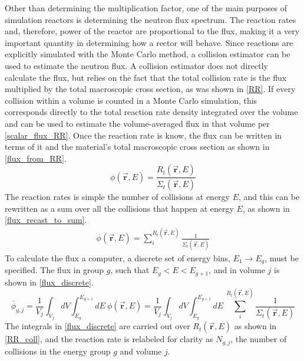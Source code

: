Other than determining the multiplication factor, one of the main purposes of simulation reactors is determining the neutron flux spectrum.  The reaction rates and, therefore, power of the reactor are proportional to the flux, making it a very important quantity in determining how a rector will behave.  Since reactions are explicitly simulated with the  Monte Carlo method, a collision estimator can be used to estimate the neutron flux.  A collision estimator does not directly calculate the flux, but relies on the fact that the total collision rate is the flux multiplied by the total macroscopic cross section, as was shown in \eqref{RR}.  If every collision within a volume is counted in a Monte Carlo simulation, this corresponds directly to the total reaction rate density integrated over the volume and can be used to estimate the volume-averaged flux in that volume per \eqref{scalar_flux_RR}.  Once the reaction rate is know, the flux can be written in terms of it and the material's total macroscopic cross section as shown in \eqref{flux_from_RR}.
%
\begin{equation}
\label{flux_from_RR}
\phi(\boldsymbol{\vec{r}},E) = \frac{ R_t(\boldsymbol{\vec{r}},E) }{  \Sigma_t(\boldsymbol{\vec{r}},E) }
\end{equation}
%
The reaction rates is simple the number of collisions at energy $E$, and this can be rewritten as a sum over all the collisions that happen at energy $E$, as shown in \eqref{flux_recast_to_sum}.
%
\begin{equation}
\label{flux_recast_to_sum}
\begin{gathered}
\phi(\boldsymbol{\vec{r}},E) = \sum_{i}^{R_t(\boldsymbol{\vec{r}},E)} \frac{ 1 }{  \Sigma_t(\boldsymbol{\vec{r}},E) }
\end{gathered}
\end{equation}
%
To calculate the flux a computer, a discrete set of energy bins, $E_1 \rightarrow E_g$, must be specified.  The flux in group $g$, such that $E_g < E < E_{g+1}$, and in volume $j$ is shown in \eqref{flux_discrete}.
%
\begin{equation}
\label{flux_discrete}
\bar{\phi}_{g,j} = \frac{1}{V_j} \int_{V_j} dV \int_{E_g}^{E_{g+1}} dE \: \phi(\boldsymbol{\vec{r}},E) = \frac{1}{V_j} \int_{V_j} dV \int_{E_g}^{E_{g+1}} dE \: \sum_{i}^{R_t(\boldsymbol{\vec{r}},E)} \frac{ 1 }{  \Sigma_t(\boldsymbol{\vec{r}},E) }
\end{equation}
%
The integrals in \eqref{flux_discrete} are carried out over $R_t(\boldsymbol{\vec{r}},E)$ as shown in \eqref{RR_coll}, and the reaction rate is relabeled for clarity as $N_{g,j}$, the number of collisions in the energy group $g$ and volume $j$. 
